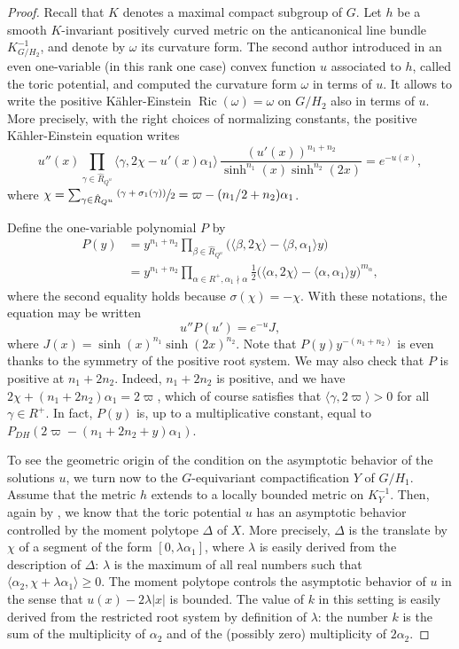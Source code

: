 \documentclass[JEP,XML,SOM,Unicode, NoEqCountersInSection, NoFloatCountersInSection]{cedram}
\newcommand{\psfrac}[2]{\sfrac{(#1)}{#2}}
\theoremstyle{plain}
\theoremstyle{definition}
\DeclareMathOperator{\Ric}{Ric}
\newcommand{\Roots}{\hat{R}}
\newcommand{\rRoots}{R}
\begin{document}
\begin{proof}
Recall that $K$ denotes a maximal compact subgroup of $G$.
Let $h$ be a smooth $K$-invariant positively curved metric on the anticanonical
line bundle $K_{G/H_2}^{-1}$, and denote by $\omega$ its curvature form.
The second author introduced in \cite{DelHoro} an even one-variable (in this rank one case)
convex function $u$ associated to $h$,
called the toric potential, and computed the curvature form $\omega$ in terms of $u$.
It allows to write the positive Kähler-Einstein $\Ric(\omega)=\omega$ on $G/H_2$ also
in terms of $u$.
More precisely, with the right choices of normalizing constants,
the positive Kähler-Einstein equation writes
\begin{equation}
u''(x)\prod_{\gamma\in \Roots_{Q^u}}\langle\gamma,2\chi-u'(x)\alpha_1\rangle\,
\frac{(u'(x))^{n_1+n_2}}{\sinh^{n_1}(x)\sinh^{n_2}(2x)} = e^{-u(x)},
\end{equation}
where $\chi=\sum_{\gamma\in \Roots_{Q^u}}\psfrac{\gamma+\sigma_1(\gamma)}{2}
=\varpi - (n_1/2+n_2)\alpha_1$.

Define the one-variable polynomial $P$ by
\begin{align*}
P(y)& =y^{n_1+n_2}\prod_{\beta\in \Roots_{Q^u}}\big(\langle\beta,2\chi\rangle-\langle\beta,\alpha_1\rangle y\big) \\
&= y^{n_1+n_2}\prod_{\alpha\in \rRoots^+, \alpha_1\nmid \alpha}\frac{1}{2}\big(\langle\alpha,2\chi\rangle-\langle\alpha,\alpha_1\rangle y\big)^{m_{\alpha}},
\end{align*}
where the second equality holds because $\sigma(\chi)=-\chi$.
With these notations, the equation may be written
\[ u''P(u')=e^{-u}J,\]
where $J(x)=\sinh(x)^{n_1}\sinh(2x)^{n_2}$.
Note that $P(y)y^{-(n_1+n_2)}$ is even thanks to the symmetry of the positive root system.
We may also check that $P$ is positive at $n_1+2n_2$. Indeed, $n_1+2n_2$ is positive, and we have
$2\chi+(n_1+2n_2)\alpha_1=2\varpi$, which of course satisfies that
$\langle\gamma,2\varpi\rangle>0$ for all $\gamma\in \rRoots^+$.
In fact, $P(y)$ is, up to a multiplicative constant, equal to $P_{DH}(2\varpi-(n_1+2n_2+y)\alpha_1)$.

To see the geometric origin of the condition on the asymptotic behavior of the
solutions $u$, we turn now to the $G$-equivariant compactification $Y$ of $G/H_1$.
Assume that the metric $h$ extends to a locally bounded metric on $K_Y^{-1}$.
Then, again by \cite{DelHoro}, we know that the toric
potential $u$ has an asymptotic behavior controlled by the moment polytope $\Delta$
of $X$. More precisely, $\Delta$ is the translate by $\chi$ of a segment of
the form $[0,\lambda \alpha_1]$, where
$\lambda$ is easily derived from the description of $\Delta$: $\lambda$ is the maximum
of all real numbers such that $\langle\alpha_2,\chi+\lambda \alpha_1\rangle\geq 0$.
The moment polytope controls the asymptotic behavior of $u$ in the sense that
$u(x)-2\lambda|x|$ is bounded.
The value of $k$ in this setting is easily derived from the restricted root
system by definition of $\lambda$: the number $k$ is the sum of the multiplicity
of $\alpha_2$ and of the (possibly zero) multiplicity of $2\alpha_2$.


\end{proof}
\end{document}
